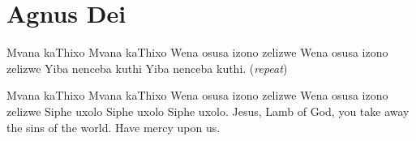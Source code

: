 \starttocol
\chapter{Agnus Dei}
\nexttocol
\hfill{\it }
\stoptocol
\starttocol
\startlines
{\sc Mvana} kaThixo
Mvana kaThixo
Wena osusa izono zelizwe
Wena osusa izono zelizwe
Yiba nenceba kuthi
Yiba nenceba kuthi.
          \hfill({\it repeat})~~~~~~~~~

Mvana kaThixo
Mvana kaThixo
Wena osusa izono zelizwe
Wena osusa izono zelizwe
Siphe uxolo
Siphe uxolo
Siphe uxolo.
\stoplines
\nexttocol
Jesus, Lamb of God, you take away the sins of the world.
Have mercy upon us.
\stoptocol
